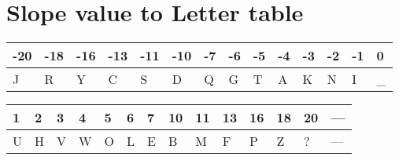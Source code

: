 \documentclass{article}
\begin{document}

\section*{Slope value to Letter table}
\noindent %
\begin{tabularx}{\textwidth}{|*{14}{W|}} %
\hline
\textbf{-20} & \textbf{-18} & \textbf{-16} & \textbf{-13} & \textbf{-11} & \textbf{-10} & \textbf{-7} & \textbf{-6} & \textbf{-5} & \textbf{-4} & \textbf{-3} & \textbf{-2} & \textbf{-1} & \textbf{0} \\
\hline
J & R & Y & C & S & D & Q & G & T & A & K & N & I & \_ \\
\hline
\end{tabularx}

\vspace{1em} %

\noindent
\begin{tabularx}{\textwidth}{|*{14}{W|}} %
\hline
\textbf{1} & \textbf{2} & \textbf{3} & \textbf{4} & \textbf{5} & \textbf{6} & \textbf{7} & \textbf{10} & \textbf{11} & \textbf{13} & \textbf{16} & \textbf{18} & \textbf{20} & \textbf{---} \\
\hline
U & H & V & W & O & L & E & B & M & F & P & Z & ? & --- \\
\hline
\end{tabularx}
\end{document}
